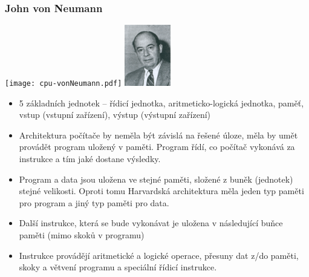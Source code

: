 \documentclass{beamer}
\begin{document}
\begin{frame}[shrink=10]
\frametitle{John von Neumann}
\begin{center}
\texttt{[image: cpu-vonNeumann.pdf]}
\hfill
\includegraphics[width=0.15\textwidth]{fig/vonNeumann.png}
\end{center}
\begin{itemize}
\item 5 základních jednotek – řídicí jednotka, aritmeticko-logická jednotka, paměť, vstup (vstupní zařízení), výstup (výstupní zařízení)
\item Architektura počítače by neměla být závislá na řešené úloze, měla by umět provádět program uložený v paměti. Program řídí, co počítač vykonává za instrukce a tím jaké dostane výsledky.
\item Program a data jsou uložena ve stejné paměti, složené z buněk (jednotek) stejné velikosti. Oproti tomu Harvardská architektura měla jeden typ paměti pro program a jiný typ paměti pro data.
\item Další instrukce, která se bude vykonávat je uložena v následující buňce paměti (mimo skoků v programu)
\item Instrukce provádějí aritmetické a logické operace, přesuny dat z/do paměti, skoky a větvení programu a speciální řídicí instrukce.
\end{itemize}
\end{frame}
\end{document}
